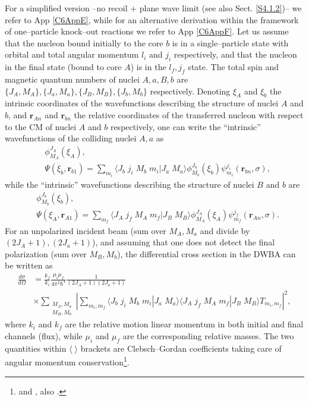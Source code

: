 For a simplified version --no recoil + plane wave limit (see also Sect. \ref{S4.1.2})-- we refer to App \ref{C6AppE}, while for an alternative derivation within the framework of one--particle knock--out reactions we refer to App \ref{C6AppF}.
Let us assume that the nucleon bound initially to the core $b$ is in a single--particle state with orbital and total angular momentum $l_i$ and  $j_i$ respectively, and that the nucleon in the final state (bound to core $A$)  is in the $l_f,j_f$ state. The total spin and magnetic quantum numbers of nuclei $A,a,B,b$ are $\{J_A,M_A\},\{J_a,M_a\},\{J_B,M_B\},\{J_b,M_b\}$ respectively. Denoting $\xi_A$ and $\xi_b$ the intrinsic coordinates of the wavefunctions describing the structure of nuclei $A$ and $b$, and $\mathbf{r}_{An}$ and $\mathbf{r}_{bn}$ the relative coordinates of the transferred nucleon with respect to the CM of nuclei $A$ and $b$ respectively, one can write the ``intrinsic''  wavefunctions of the colliding nuclei $A,a$ as 
\begin{equation}\label{eq_onept2}
    \begin{split}
    &\phi_{M_A}^{J_A}(\xi_A),\\
    &\Psi(\xi_b,\mathbf{r}_{b1})=\sum_{m_i}\langle J_b\;j_i\;M_b\;m_i|J_a\;M_a\rangle\phi_{M_b}^{J_b}(\xi_b)\psi_{m_i}^{j_i}(\mathbf{r}_{bn},\sigma),
    \end{split}
\end{equation}
while the ``intrinsic'' wavefunctions describing the structure of nuclei $B$ and $b$ are
\begin{equation}\label{eq_onept3}
    \begin{split}
    &\phi_{M_b}^{J_b}(\xi_b),\\
    &\Psi(\xi_A,\mathbf{r}_{A1})=\sum_{m_f}\langle J_A\;j_f\;M_A\;m_f|J_B\;M_B\rangle\phi_{M_A}^{J_A}(\xi_A)\psi_{m_f}^{j_f}(\mathbf{r}_{An},\sigma).
    \end{split}
\end{equation}
For an unpolarized incident beam (sum over $M_A,M_a$ and divide  by $(2J_A+1),(2J_a+1)$), and assuming that  one does not detect the final polarization (sum over $M_B,M_b$), the differential cross section in the DWBA can be written as
\begin{equation}\label{eq_onept4}
    \begin{split}
\frac{d\sigma}{d\Omega}&=\frac{k_f}{k_i}\frac{\mu_i\mu_f}{4\pi^2\hbar^4}\frac{1}{(2J_A+1)(2J_a+1)}\\
&\times\sum_{\substack{M_A,M_a\\M_B,M_b}}\left|\sum_{m_i,m_f}\langle J_b\;j_i\;M_b\;m_i|J_a\;M_a\rangle\langle J_A\;j_f\;M_A\;m_f|J_B\;M_B\rangle T_{m_i,m_f}\right|^2,
    \end{split}
\end{equation}
where $k_i$ and $k_f$ are the relative motion linear momentum in both initial and final channels (flux), while $\mu_i$ and $\mu_f$ are the corresponding relative masses. The two quantities within $\langle\;\rangle$ brackets are Clebsch--Gordan coefficients taking care of angular momentum conservation\footnote{\cite{Brink:68} and \cite{Edmonds:60}, also \cite{Bohr:69}.}.


